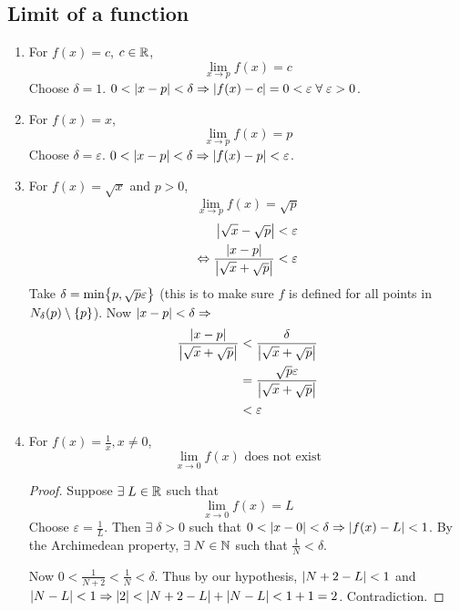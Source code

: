 \documentclass[12pt]{article}
\begin{document}
\subsection{Limit of a function}
\begin{example}
    \begin{enumerate}[label=(\alph*)]
        \item For $f(x) = c$, $c \in \mathbb{R}$, \[
            \lim_{x \to p} f(x) = c
        \] Choose $\delta = 1$. $0 < \abs{ x - p } < \delta \implies \abs{ f(x) - c } = 0 < \varepsilon \;\forall\; \varepsilon > 0$.

        \item For $f(x) = x$, \[
            \lim_{x \to p} f(x) = p
        \] Choose $\delta = \varepsilon$. $ 0 < \abs{ x - p } < \delta \implies \abs{ f(x) - p} < \varepsilon$.

        \item For $f(x) = \sqrt{x}$ and $p > 0$, \[
            \lim_{x \to p} f(x) = \sqrt{p}
        \]
        \begin{align*}
            \abs{ \sqrt{x} - \sqrt{p} } &< \varepsilon \\
            \iff \frac{\abs{ x - p }}{\abs{ \sqrt{x} + \sqrt{p} }} &< \varepsilon \\
        \end{align*}
        Take $\delta = \min \set{p, \sqrt{p} \varepsilon}$ (this is to make sure $f$ is defined for all points in $N_{\delta}(p) \setminus \set{p}$). Now $\abs{ x - p} < \delta \implies$
        \begin{align*}
            \frac{\abs{ x - p }}{\abs{ \sqrt{x} + \sqrt{p} }} &< \frac{\delta}{\abs{ \sqrt{x} + \sqrt{p} }} \\
            &= \frac{\sqrt{p} \varepsilon}{\abs{ \sqrt{x} + \sqrt{p} }} \\
            &< \varepsilon \qedhere
        \end{align*}

        \item For $f(x) = \frac{1}{x}, x \neq 0$, \[
            \lim_{x \to 0} f(x) \text{ does not exist}
        \]
        \begin{proof}
            Suppose $\exists\; L \in \mathbb{R}$ such that \[
                \lim_{x \to 0} f(x) = L
            \] Choose $\varepsilon = \frac{1}{L}$. Then $\exists\; \delta > 0$ such that $ 0 < \abs{ x - 0 } < \delta \implies \abs{ f(x) - L } < 1$. By the Archimedean property, $\exists\; N \in \mathbb{N}$ such that $\frac{1}{N} < \delta$.

            Now $0 < \frac{1}{N+2} < \frac{1}{N} < \delta$. Thus by our hypothesis, $\abs{ N + 2 - L } < 1$ and $\abs{ N - L } < 1 \implies \abs{ 2 } < \abs{ N + 2 - L } + \abs{ N - L } < 1 + 1 = 2$. Contradiction.
        \end{proof}
    \end{enumerate}
\end{example}
\end{document}
